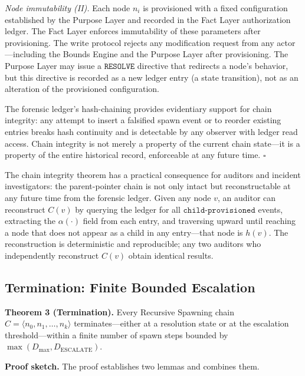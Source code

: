 \medskip
\textit{Node immutability (II).} Each node $n_i$ is provisioned with a fixed configuration established by the Purpose Layer and recorded in the Fact Layer authorization ledger. The Fact Layer enforces immutability of these parameters after provisioning. The write protocol rejects any modification request from any actor---including the Bounds Engine and the Purpose Layer after provisioning. The Purpose Layer may issue a $\texttt{RESOLVE}$ directive that redirects a node's behavior, but this directive is recorded as a new ledger entry (a state transition), not as an alteration of the provisioned configuration.

The forensic ledger's hash-chaining provides evidentiary support for chain integrity: any attempt to insert a falsified spawn event or to reorder existing entries breaks hash continuity and is detectable by any observer with ledger read access. Chain integrity is not merely a property of the current chain state---it is a property of the entire historical record, enforceable at any future time. $\square$

\medskip
The chain integrity theorem has a practical consequence for auditors and incident investigators: the parent-pointer chain is not only intact but reconstructable at any future time from the forensic ledger. Given any node $v$, an auditor can reconstruct $C(v)$ by querying the ledger for all $\texttt{child-provisioned}$ events, extracting the $\alpha(\cdot)$ field from each entry, and traversing upward until reaching a node that does not appear as a child in any entry---that node is $h(v)$. The reconstruction is deterministic and reproducible; any two auditors who independently reconstruct $C(v)$ obtain identical results.

\subsection{Termination: Finite Bounded Escalation}
\label{sec:rs-termination-formal}

\medskip
\noindent\textbf{Theorem 3 (Termination).} Every Recursive Spawning chain $C = \langle n_0, n_1, \ldots, n_k \rangle$ terminates---either at a resolution state or at the escalation threshold---within a finite number of spawn steps bounded by $\max(D_{\mathrm{max}}, D_{\mathrm{ESCALATE}})$.

\medskip
\noindent\textbf{Proof sketch.} The proof establishes two lemmas and combines them.

